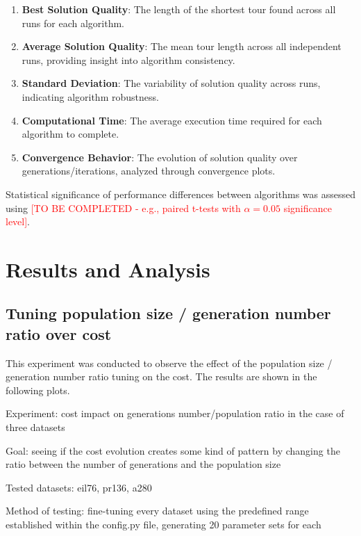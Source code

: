 \documentclass{scrartcl}
\begin{document}
\begin{enumerate}
    \item \textbf{Best Solution Quality}: The length of the shortest tour found across all runs for each algorithm.
    
    \item \textbf{Average Solution Quality}: The mean tour length across all independent runs, providing insight into algorithm consistency.
    
    \item \textbf{Standard Deviation}: The variability of solution quality across runs, indicating algorithm robustness.
    
    \item \textbf{Computational Time}: The average execution time required for each algorithm to complete.
    
    \item \textbf{Convergence Behavior}: The evolution of solution quality over generations/iterations, analyzed through convergence plots.
\end{enumerate}

Statistical significance of performance differences between algorithms was assessed using \textcolor{red}{[TO BE COMPLETED - e.g., paired t-tests with $\alpha = 0.05$ significance level]}.

\section{Results and Analysis}
\label{sec:results-analysis}

\subsection[Experiment 1]{Tuning population size / generation number ratio over cost}

This experiment was conducted to observe the effect of the population size / generation number ratio tuning on the cost. The results are shown in the following plots.

Experiment: cost impact on generations number/population ratio in the case of three datasets

Goal: seeing if the cost evolution creates some kind of pattern by changing the ratio between the number of generations and the population size

Tested datasets: eil76, pr136, a280

Method of testing: fine-tuning every dataset using the predefined range established within the config.py file, generating 20 parameter sets for each
\end{document}
